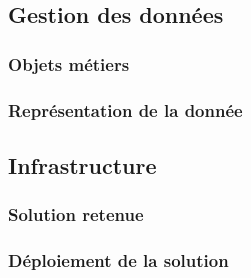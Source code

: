 \subsection{Gestion des données}

\subsubsection{Objets métiers}


\subsubsection{Représentation de la donnée}


\subsection{Infrastructure}

\subsubsection{Solution retenue}


\subsubsection{Déploiement de la solution}

